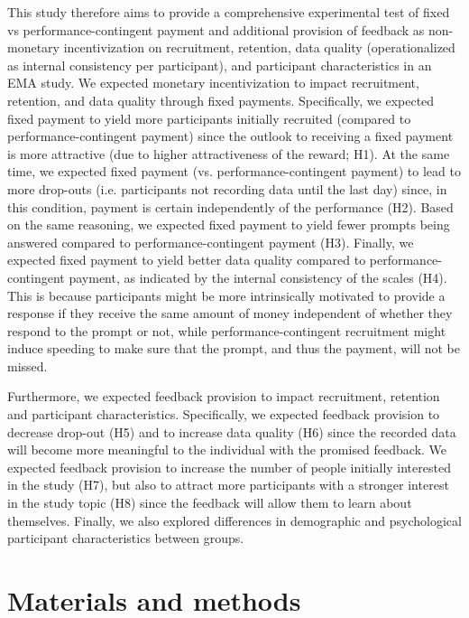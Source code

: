 \documentclass[authordate, empirical]{jote-new-article}
\begin{document}
	This study therefore aims to provide a comprehensive experimental test of fixed vs performance-contingent payment and additional provision of feedback as non-monetary incentivization on recruitment, retention, data quality (operationalized as internal consistency per participant), and participant characteristics in an EMA study. We expected monetary incentivization to impact recruitment, retention, and data quality through fixed payments. Specifically, we expected fixed payment to yield more participants initially recruited (compared to performance-contingent payment) since the outlook to receiving a fixed payment is more attractive (due to higher attractiveness of the reward; H1). At the same time, we expected fixed payment (vs. performance-contingent payment) to lead to more drop-outs (i.e. participants not recording data until the last day) since, in this condition, payment is certain independently of the performance (H2). Based on the same reasoning, we expected fixed payment to yield fewer prompts being answered compared to performance-contingent payment (H3). Finally, we expected fixed payment to yield better data quality compared to performance-contingent payment, as indicated by the internal consistency of the scales (H4). This is because participants might be more intrinsically motivated to provide a response if they receive the same amount of money independent of whether they respond to the prompt or not, while performance-contingent recruitment might induce speeding to make sure that the prompt, and thus the payment, will not be missed.



	Furthermore, we expected feedback provision to impact recruitment, retention and participant characteristics. Specifically, we expected feedback provision to decrease drop-out (H5) and to increase data quality (H6) since the recorded data will become more meaningful to the individual with the promised feedback. We expected feedback provision to increase the number of people initially interested in the study (H7), but also to attract more participants with a stronger interest in the study topic (H8) since the feedback will allow them to learn about themselves. Finally, we also explored differences in demographic and psychological participant characteristics between groups.



	\section{Materials and methods}
\end{document}

